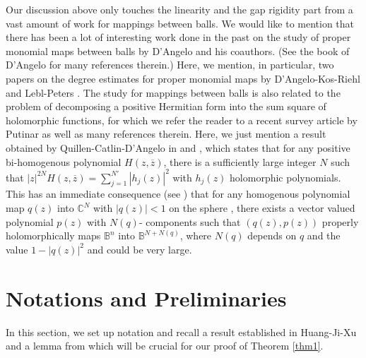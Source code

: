 \documentclass[12pt]{article}
\numberwithin{equation}{section}
\def\BB{{\mathbb B}}
\def\CC{{\mathbb C}}
\def\ov{\overline}
\begin{document}
Our discussion above only touches the linearity and the gap rigidity
part from a vast amount of work for mappings between balls.
We would like to mention that
 there has been a lot of interesting   work done in the past on the study of proper monomial
maps between balls by D'Angelo and his coauthors. (See the book of
D'Angelo \cite{DA} for many references therein.) Here, we  mention,
in particular, two   papers on the   degree estimates for proper
monomial maps by D'Angelo-Kos-Riehl \cite{DKR} and Lebl-Peters
\cite{LP}. The study for mappings between balls is also related to
the problem of decomposing a positive Hermitian form into the sum
square of holomorphic functions, for which we refer the reader to a
recent survey article by Putinar \cite{Put} as well as many
references therein. Here, we just mention a result obtained by
Quillen-Catlin-D'Angelo  in \cite{Qu}  and \cite{CD}, which states
that for any positive bi-homogenous polynomial $H(z,\ov{z})$, there
is a sufficiently large integer $N$ such that
$|z|^{2N}H(z,\ov{z})=\sum_{j=1}^{N'}|h_j(z)|^2$ with $h_j(z)$
holomorphic  polynomials. This has an immediate consequence (see
\cite{CD}) that for any homogenous polynomial map $q(z)$ into
${\CC}^N$ with $
 |q(z)|<1$ on the sphere ,  there exists a vector valued polynomial $p(z)$ with $N(q)$-
 components such that ${( q(z), p(z))}$ properly holomorphically
maps $\mathbb{ B}^{n}$ into $\mathbb{ B}^{N+N(q)}$, where $N(q)$
depends on $q$ and the value $1-|q(z)|^2$ and could be very large.







\section{Notations and Preliminaries}
In this section, we set up notation and recall a result established
in Huang-Ji-Xu \cite{HJX1} and a lemma from \cite{Hu1} which will be crucial
for our proof of Theorem \ref{thm1}.
\end{document}
